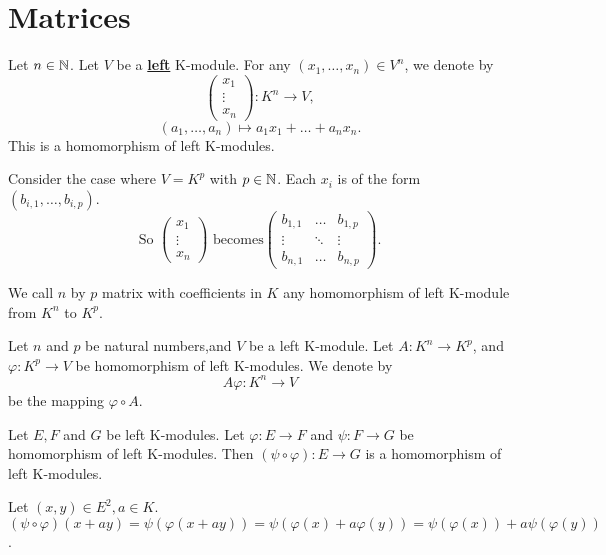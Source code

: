 \section{Matrices}
\begin{definitionenv}
    Let $n\in \mathbb{N}$. Let $V$ be a \underline{\textbf{left}} K-module. For any $(x_1, \dots, x_n)\in V^n$,  we denote by 
    $$\begin{pmatrix}
x_1 \\
 \vdots \\
x_n
\end{pmatrix}
:
K^n\longrightarrow V, $$
$$(a_1, \dots, a_n)\longmapsto a_1x_1+\dots+a_nx_n. $$
This is a homomorphism of left K-modules.
\end{definitionenv}
\begin{exampleenv}
    Consider the case where $V=K^p$ with $p\in \mathbb{N}$. Each $x_i$ is of the form $(b_{i, 1}, \dots, b_{i, p})$.
    $$\text{So } \begin{pmatrix}
x_1 \\
 \vdots \\
x_n
\end{pmatrix}
\text{ becomes}
\begin{pmatrix}
  b_{1, 1}& \dots  &b_{1, p} \\
  \vdots & \ddots  & \vdots \\
  b_{n, 1}& \dots &b_{n, p}
\end{pmatrix} .$$
\end{exampleenv}
\begin{definitionenv}
    We call $n$ by $p$ matrix with coefficients in $K$ any homomorphism of left K-module from $K^n$ to $K^p$.
\end{definitionenv}
\begin{definitionenv}
    Let $n$ and $p$ be natural numbers,and $V$ be a left K-module. Let $A:K^n\rightarrow K^p$, and $\varphi:K^p\rightarrow V$ be homomorphism of left K-modules. We denote by 
    $$A\varphi:K^n\longrightarrow V $$
    be the mapping $\varphi\circ A.$
\end{definitionenv}
\begin{propositionenv}
    Let $E,F$ and $G$ be left K-modules. Let $\varphi:E\rightarrow F$ and $\psi:F\rightarrow G$ be homomorphism of left K-modules. Then $(\psi\circ \varphi):E\rightarrow G$ is a homomorphism of left K-modules.
\end{propositionenv}
\begin{proofenv}
    Let $(x,y)\in E^2, a\in K$. $(\psi\circ\varphi)(x+ay)=\psi(\varphi(x+ay))=\psi(\varphi(x)+a\varphi(y))=\psi(\varphi(x))+a\psi(\varphi(y))$.
\end{proofenv}


